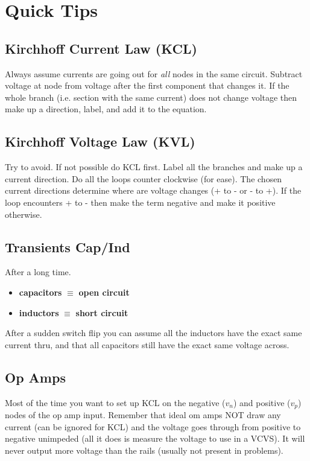 \section{Quick Tips}
\subsection*{Kirchhoff Current Law (KCL)}
Always assume currents are going out for \textit{all} nodes in the same
circuit. Subtract voltage at node from voltage after the first component
that changes it. If the whole branch (i.e. section with the same
current) does not change voltage then make up a direction, label, and
add it to the equation.

\subsection*{Kirchhoff Voltage Law (KVL)}
Try to avoid. If not possible do KCL first. Label all the branches and
make up a current direction. Do all the loops counter clockwise (for
ease). The chosen current directions determine where are voltage changes
(+ to - or - to +). If the loop encounters + to - then make the term
negative and make it positive otherwise.

\subsection*{Transients Cap/Ind}
After a long time.
\begin{itemize}
  \item \textbf{capacitors} $\equiv$ \textbf{open circuit}
  \item \textbf{inductors} $\equiv$ \textbf{short circuit}
\end{itemize}
After a sudden switch flip you can assume all the inductors have the
exact same current thru, and that all capacitors still have the exact
same voltage across.

\subsection*{Op Amps}
Most of the time you want to set up KCL on the negative ($v_n$) and
positive ($v_p$) nodes of the op amp input. Remember that ideal om amps
NOT draw any current (can be ignored for KCL) and the voltage goes
through from positive to negative unimpeded (all it does is measure the
voltage to use in a VCVS). It will never output more voltage than the
rails (usually not present in problems).
